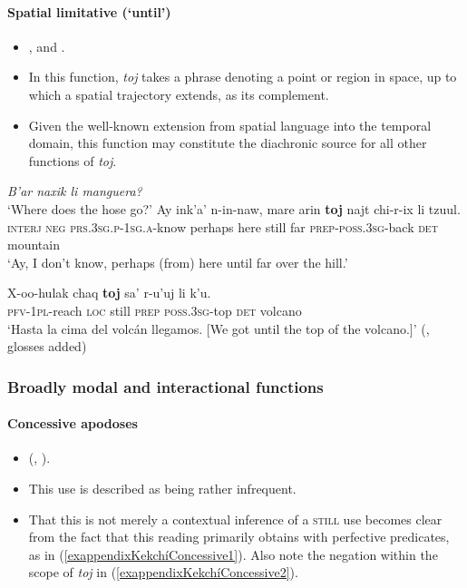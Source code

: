 \paragraph{Spatial limitative (\lq until\rq)}
\label{appendixKekchiSpatialLimit}
\begin{itemize}
	\item  \textcite[171]{VocabularioKechi2004}, \textcite[189]{EachusCarlson1980} and \textcite{Kockelman2020}.
	\item In this function, \textit{toj} takes a phrase denoting a point or region in space, up to which a spatial trajectory extends, as its complement.
	\item Given the well-known extension from spatial language into the temporal domain, this function may constitute the diachronic source for all other functions of \textit{toj}.
\end{itemize}
\begin{exe}
	\ex
	\begin{xlist}
		\textit{B'ar naxik li manguera?}\\
		\lq Where does the hose go?\rq{}
		\gll  Ay ink'a' n-in-naw, mare arin \textbf{toj} najt chi-r-ix li tzuul.\\
	\textsc{interj} \textsc{neg} \textsc{prs}.3\textsc{sg}.\textsc{p}-1\textsc{sg}.\textsc{a}-know perhaps here still far \textsc{prep}-\textsc{poss}.3\textsc{sg}-back \textsc{det} mountain\\
	\glt \lq Ay, I don't know, perhaps (from) here until far over the hill.' \parencite[464]{Kockelman2020}
	\end{xlist}

	\ex
	\gll X-oo-hulak chaq \textbf{toj} sa’ r-u’uj li k’u.\\
	\textsc{pfv}-1\textsc{pl}-reach \textsc{loc} still \textsc{prep} \textsc{poss}.3\textsc{sg}-top \textsc{det} volcano\\
	\glt \lq Hasta la cima del volcán llegamos. [We got until the top of the volcano.]' (\cite[115]{VocabularioKechi2004}, glosses added)
\end{exe}

\subsubsection{Broadly modal and interactional functions}
\paragraph{Concessive apodoses}
\label{appendixKekchiConcessiveConsequent}
\begin{itemize}
	\item \citeauthor{Kockelman2020} (\citeyear[106]{Kockelman2010}, \citeyear{Kockelman2020}).
	\item This use is described as being rather infrequent. 
	\item That this is not merely a contextual inference of a \textsc{still} use becomes clear from the fact that this reading primarily obtains with perfective predicates, as in (\ref{exappendixKekchíConcessive1}). Also note the negation within the scope of \textit{toj} in (\ref{exappendixKekchíConcessive2}). 
\end{itemize}


